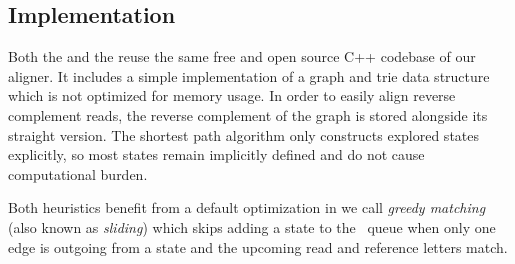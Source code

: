 \subsection{Implementation}

Both the \seedh and the \prefixh reuse the same free and open source C++
codebase of our \astarix aligner. It includes a simple implementation of a graph
and trie data structure which is not optimized for memory usage. In order to
easily align reverse complement reads, the reverse complement of the graph is
stored alongside its straight version. The shortest path algorithm only
constructs explored states explicitly, so most states remain implicitly defined
and do not cause computational burden.

Both heuristics benefit from a default optimization in \astarix we call
\emph{greedy matching} (also known as \emph{sliding}) which skips adding a state
to the \A~queue when only one edge is outgoing from a state and the upcoming
read and reference letters match.